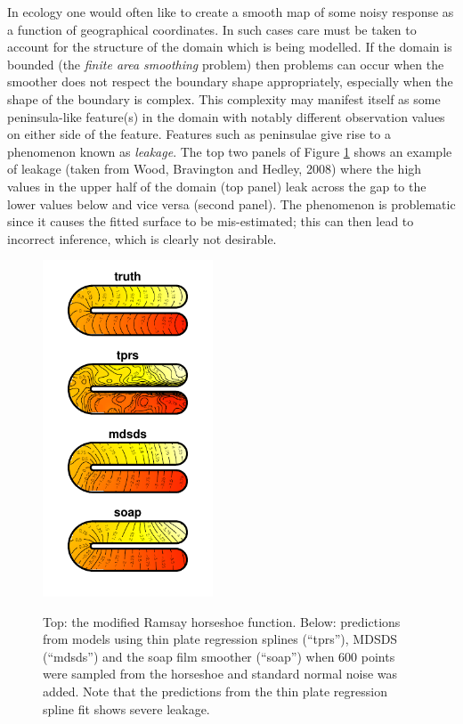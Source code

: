\documentclass[useAMS, referee]{biom}
\begin{document}
In ecology one would often like to create a smooth map of some noisy response as a function of geographical coordinates. In such cases care must be taken to account for the structure of the domain which is being modelled. If the domain is bounded (the \textit{finite area smoothing} problem) then problems can occur when the smoother does not respect the boundary shape appropriately, especially when the shape of the boundary is complex. This complexity may manifest itself as some peninsula-like feature(s) in the domain with notably different observation values on either side of the feature. Features such as peninsulae give rise to a phenomenon known as \emph{leakage}. The top two panels of Figure \ref{leakage} shows an example of leakage (taken from Wood, Bravington and Hedley, 2008) where the high values in the upper half of the domain (top panel) leak across the gap to the lower values below and vice versa (second panel). The phenomenon is problematic since it causes the fitted surface to be mis-estimated; this can then lead to incorrect inference, which is clearly not desirable. 

\begin{figure}
\centering
\includegraphics[width=0.45\textwidth]{examples/ramsay/ramsay-real.pdf}\\
\caption{Top: the modified Ramsay horseshoe function. Below: predictions from models using thin plate regression splines (``tprs''), MDSDS (``mdsds'') and the soap film smoother (``soap'') when 600 points were sampled from the horseshoe and standard normal noise was added. Note that the predictions from the thin plate regression spline fit shows severe leakage.}
\label{leakage}
\end{figure}
\end{document}
